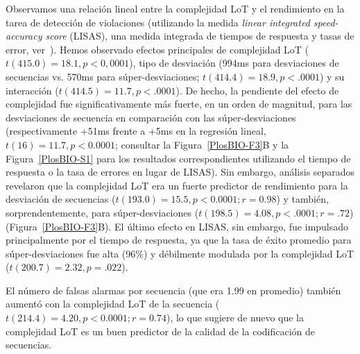 Observamos una relación lineal entre la complejidad LoT y el rendimiento en la tarea de detección de violaciones (utilizando la medida \textit{linear integrated speed-accuracy score} (LISAS), una medida integrada de tiempos de respuesta y tasas de error, ver~\cite{f87,f88}). Hemos observado efectos principales de complejidad LoT ($t(415.0) = 18.1, p <0,0001$), tipo de desviación (994ms para desviaciones de secuencias vs. 570ms para súper-desviaciones; $t (414.4) = 18.9, p < .0001$) y su interacción ($t(414.5) = 11. 7, p < .0001$). De hecho, la pendiente del efecto de complejidad fue significativamente más fuerte, en un orden de magnitud, para las desviaciones de secuencia en comparación con las súper-desviaciones (respectivamente +51ms frente a +5ms en la regresión lineal, $t(16) = 11.7, p <0.0001$; consultar la Figura~\ref{PlosBIO-F3}B y la Figura~\ref{PlosBIO-S1} para los resultados correspondientes utilizando el tiempo de respuesta o la tasa de errores en lugar de LISAS). Sin embargo, análisis separados revelaron que la complejidad LoT era un fuerte predictor de rendimiento para la desviación de secuencias ($t(193.0) = 15.5, p <0.0001; r = 0.98$) y también, sorprendentemente, para súper-desviaciones ($t (198.5) = 4.08, p < .0001; r = .72$) (Figura~\ref{PlosBIO-F3}B). El último efecto en LISAS, sin embargo, fue impulsado principalmente por el tiempo de respuesta, ya que la tasa de éxito promedio para súper-desviaciones fue alta (96\%) y débilmente modulada por la complejidad LoT ($t(200.7) = 2.32, p = .022$).


El número de falsas alarmas por secuencia (que era 1.99 en promedio) también aumentó con la complejidad LoT de la secuencia ($t(214.4)= 4.20, p <0.0001; r = 0.74$), lo que sugiere de nuevo que la complejidad LoT es un buen predictor de la calidad de la codificación de secuencias.


